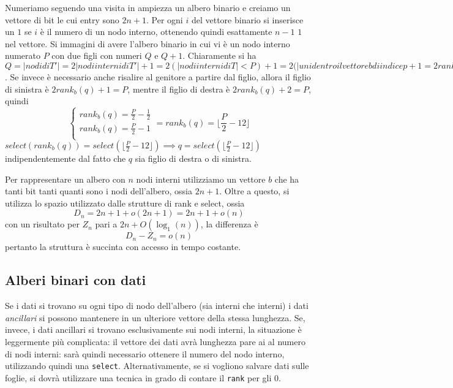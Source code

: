 Numeriamo seguendo una visita in ampiezza un albero binario e creiamo un vettore di bit
le cui entry sono $2n+1$. Per ogni $i$ del vettore binario si inserisce un $1$ se $i$ è il numero di
un nodo interno, ottenendo quindi esattamente $n-1$ $1$ nel vettore.
Si immagini di avere l'albero binario in cui vi è un nodo interno numerato $P$ con due figli con numeri $Q$ e $Q+1$.
Chiaramente si ha $Q = |nodi di T'| = 2 |nodi interni di T'| + 1 = 2(|nodi interni di T| < P) + 1 = 2(|uni dentro il vettore b di indice p +1 = 2rank_b(P) +1$.
Se invece è necessario anche risalire al genitore a partire dal figlio, allora il figlio di sinistra è
$2rank_b(q) +1 = P$, mentre il figlio di destra è $2rank_b(q) + 2 = P$, quindi
$$
	\begin{cases}
		rank_b(q) = \frac{P}{2} - \frac{1}{2} \\
		rank_b(q) = \frac{P}{2} - 1           \\
	\end{cases}
	= rank_b(q) = \lfloor\frac{P}{2} - {1}{2} \rfloor
$$
$select(rank_b(q)) = select(\lfloor\frac{P}{2} - {1}{2} \rfloor) \implies q = select(\lfloor\frac{P}{2} - {1}{2}\rfloor)$
indipendentemente dal fatto che $q$ sia figlio di destra o di sinistra.


Per rappresentare un albero con $n$ nodi interni utilizziamo un vettore $b$ che ha tanti
bit tanti quanti sono i nodi dell'albero, ossia $2n +1$. Oltre a questo, si utilizza
lo spazio utilizzato dalle strutture di rank e select, ossia
$$
	D_n = 2n +1 + o(2n+1) = 2n + 1 + o(n)
$$
con un risultato per $Z_n$ pari a $2n + O(\log_1(n))$, la differenza è
$$
	D_n - Z_n = o(n)
$$
pertanto la struttura è succinta con accesso in tempo costante.

\subsection{Alberi binari con dati}
Se i dati si trovano su ogni tipo di nodo dell'albero (sia interni che interni) i dati
\textit{ancillari} si possono mantenere in un ulteriore vettore della stessa lunghezza.
Se, invece, i dati ancillari si trovano esclusivamente sui nodi interni, la situazione è leggermente
più complicata: il vettore dei dati avrà lunghezza pare ai al numero di nodi interni: sarà quindi
necessario ottenere il numero del nodo interno, utilizzando quindi una \texttt{select}. Alternativamente,
se si vogliono salvare dati sulle foglie, si dovrà utilizzare una tecnica in grado di contare il \texttt{rank}
per gli $0$.

